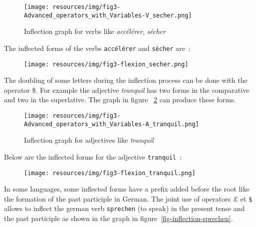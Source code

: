 \begin{figure}[!ht]
\begin{center}
\texttt{[image: resources/img/fig3-Advanced\_operators\_with\_Variables-V\_secher.png]}
\caption{Inflection graph for verbs like {\it accélérer}, {\it sécher}
\label{fig-inflection-secher}}
\end{center}
\end{figure}

\newpage
\noindent
The inflected forms of the verbs \verb+accélérer+ and \verb+sécher+ are~:

\begin{figure}[!ht]
\begin{center}
\texttt{[image: resources/img/fig3-flexion\_secher.png]}
\end{center}
\end{figure}

\bigskip
\noindent
The doubling of some letters during the inflection process can be done with the operator \$.
For example the adjective {\it tranquil} has two forms in the comparative and two in the 
superlative. The graph in figure ~\ref{fig-inflection-tranquil} can produce these forms.

\bigskip
\begin{figure}[!ht]
\begin{center}
\texttt{[image: resources/img/fig3-Advanced\_operators\_with\_Variables-A\_tranquil.png]}
\caption{Inflection graph for adjectives like {\it tranquil}
\label{fig-inflection-tranquil}}
\end{center}
\end{figure}

\noindent Below are the inflected forms for the adjective \verb+tranquil+~:

\bigskip
\begin{figure}[!ht]
\begin{center}
\texttt{[image: resources/img/fig3-flexion\_tranquil.png]}
\end{center}
\end{figure}

\noindent  In some languages, some inflected forms have a prefix added before the root like the formation of the past participle in German. The joint use of operators
${\pounds}$ et \verb+$+ allows to inflect the german verb \verb+sprechen+ (to speak)
in the present tense and the past participle as shown in the graph in figure~\ref{fig-inflection-sprechen}.

